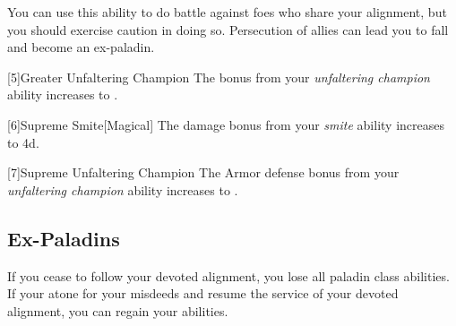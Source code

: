         You can use this ability to do battle against foes who share your alignment, but you should exercise caution in doing so.
        Persecution of allies can lead you to fall and become an ex-paladin.

        [5]{Greater Unfaltering Champion} The  bonus from your \textit{unfaltering champion} ability increases to .

        [6]{Supreme Smite}[Magical] The damage bonus from your \textit{smite} ability increases to \plus4d.

        [7]{Supreme Unfaltering Champion}
        The Armor defense bonus from your \textit{unfaltering champion} ability increases to .


    \subsection{Ex-Paladins}
        If you cease to follow your devoted alignment, you lose all  paladin class abilities.
        If your atone for your misdeeds and resume the service of your devoted alignment, you can regain your abilities.

\newpage
